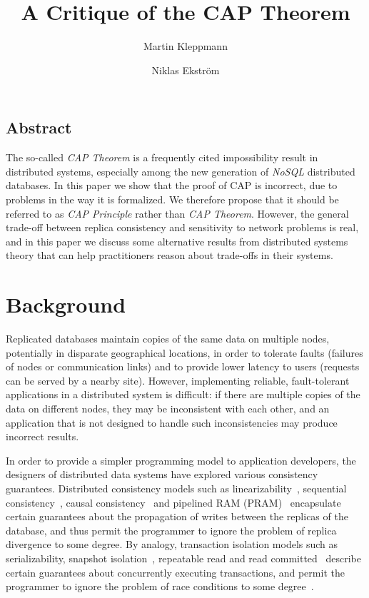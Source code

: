 \documentclass[a4paper,twocolumn,10pt]{article}
\begin{document}
\sloppy
\date{} %
\title{A Critique of the CAP Theorem}
\author{Martin Kleppmann \and Niklas Ekstr{\"o}m}
\maketitle

\subsection*{Abstract}

The so-called \emph{CAP Theorem} is a frequently cited impossibility result in distributed systems,
especially among the new generation of \emph{NoSQL} distributed databases. In this paper we show
that the proof of CAP is incorrect, due to problems in the way it is formalized. We therefore
propose that it should be referred to as \emph{CAP Principle} rather than \emph{CAP Theorem}.
However, the general trade-off between replica consistency and sensitivity to network problems is
real, and in this paper we discuss some alternative results from distributed systems theory that can
help practitioners reason about trade-offs in their systems.

\section{Background}

Replicated databases maintain copies of the same data on multiple nodes, potentially in disparate
geographical locations, in order to tolerate faults (failures of nodes or communication links) and
to provide lower latency to users (requests can be served by a nearby site). However, implementing
reliable, fault-tolerant applications in a distributed system is difficult: if there are multiple
copies of the data on different nodes, they may be inconsistent with each other, and an application
that is not designed to handle such inconsistencies may produce incorrect results.

In order to provide a simpler programming model to application developers, the designers of
distributed data systems have explored various consistency guarantees. Distributed consistency
models such as linearizability~\cite{Herlihy1990jq}, sequential consistency~\cite{Lamport1979ky},
causal consistency~\cite{Ahamad1995gl} and pipelined RAM (PRAM)~\cite{Lipton1988uh} encapsulate
certain guarantees about the propagation of writes between the replicas of the database, and thus
permit the programmer to ignore the problem of replica divergence to some degree. By analogy,
transaction isolation models such as serializability, snapshot isolation~\cite{Berenson1995kj},
repeatable read and read committed~\cite{Gray1976us} describe certain guarantees about concurrently
executing transactions, and permit the programmer to ignore the problem of race conditions to some
degree~\cite{Bailis2014vc}.
\end{document}
